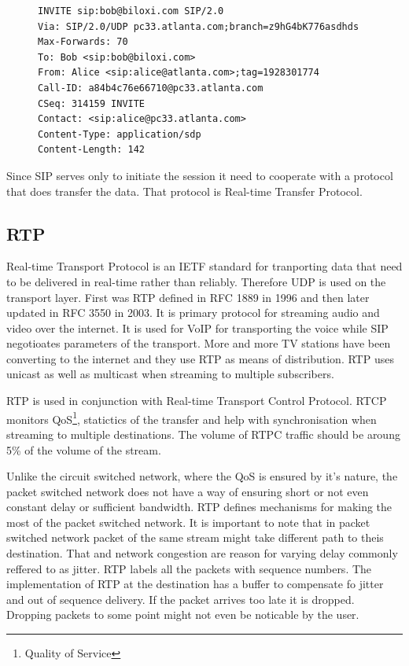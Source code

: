 \begin{figure}[h]
\begin{lstlisting}
INVITE sip:bob@biloxi.com SIP/2.0
Via: SIP/2.0/UDP pc33.atlanta.com;branch=z9hG4bK776asdhds
Max-Forwards: 70
To: Bob <sip:bob@biloxi.com>
From: Alice <sip:alice@atlanta.com>;tag=1928301774
Call-ID: a84b4c76e66710@pc33.atlanta.com
CSeq: 314159 INVITE
Contact: <sip:alice@pc33.atlanta.com>
Content-Type: application/sdp
Content-Length: 142
\end{lstlisting}
\end{figure}

Since SIP serves only to initiate the session it need to cooperate with a protocol that does transfer the data. That protocol is Real-time Transfer Protocol.  

\subsection*{RTP}
Real-time Transport Protocol is an IETF standard for tranporting data that need to be delivered in real-time rather than reliably. Therefore UDP is used on the transport layer. First was RTP defined in RFC 1889 in 1996 and then later updated in RFC 3550 in 2003. It is primary protocol for streaming audio and video over the internet. It is used for VoIP for transporting the voice while SIP negotioates parameters of the transport. More and more TV stations have been converting to the internet and they use RTP as means of distribution. RTP uses unicast as well as multicast when streaming to multiple subscribers.

RTP is used in conjunction with Real-time Transport Control Protocol. RTCP monitors QoS\footnote{Quality of Service}, statictics of the transfer and help with synchronisation when streaming to multiple destinations. The volume of RTPC traffic should be aroung 5\% of the volume of the stream.  

Unlike the circuit switched network, where the QoS is ensured by it's nature, the packet switched network does not have a way of ensuring short or not even constant delay or sufficient bandwidth. RTP defines mechanisms for making the most of the packet switched network. It is important to note that in packet switched network packet of the same stream might take different path to theis destination. That and network congestion are reason for varying delay commonly reffered to as jitter. RTP labels all the packets with sequence numbers. The implementation of RTP at the destination has a buffer to compensate fo jitter and out of sequence delivery. If the packet arrives too late it is dropped. Dropping packets to some point might not even be noticable by the user. 


